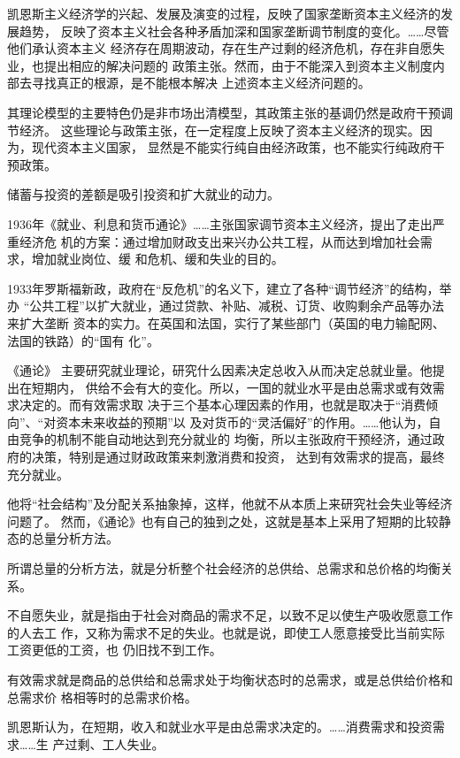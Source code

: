 
凯恩斯主义经济学的兴起、发展及演变的过程，反映了国家垄断资本主义经济的发展趋势，
反映了资本主义社会各种矛盾加深和国家垄断调节制度的变化。……尽管他们承认资本主义
经济存在周期波动，存在生产过剩的经济危机，存在非自愿失业，也提出相应的解决问题的
政策主张。然而，由于不能深入到资本主义制度内部去寻找真正的根源，是不能根本解决
上述资本主义经济问题的。

其理论模型的主要特色仍是非市场出清模型，其政策主张的基调仍然是政府干预调节经济。
这些理论与政策主张，在一定程度上反映了资本主义经济的现实。因为，现代资本主义国家，
显然是不能实行纯自由经济政策，也不能实行纯政府干预政策。

储蓄与投资的差额是吸引投资和扩大就业的动力。

1936年《就业、利息和货币通论》……主张国家调节资本主义经济，提出了走出严重经济危
机的方案：通过增加财政支出来兴办公共工程，从而达到增加社会需求，增加就业岗位、缓
和危机、缓和失业的目的。

1933年罗斯福新政，政府在“反危机”的名义下，建立了各种“调节经济”的结构，举办
“公共工程”以扩大就业，通过贷款、补贴、减税、订货、收购剩余产品等办法来扩大垄断
资本的实力。在英国和法国，实行了某些部门（英国的电力输配网、法国的铁路）的“国有
化”。

《通论》 主要研究就业理论，研究什么因素决定总收入从而决定总就业量。他提出在短期内，
供给不会有大的变化。所以，一国的就业水平是由总需求或有效需求决定的。而有效需求取
决于三个基本心理因素的作用，也就是取决于“消费倾向”、“对资本未来收益的预期”以
及对货币的“灵活偏好”的作用。……他认为，自由竞争的机制不能自动地达到充分就业的
均衡，所以主张政府干预经济，通过政府的决策，特别是通过财政政策来刺激消费和投资，
达到有效需求的提高，最终充分就业。

他将“社会结构”及分配关系抽象掉，这样，他就不从本质上来研究社会失业等经济问题了。
然而，《通论》也有自己的独到之处，这就是基本上采用了短期的比较静态的总量分析方法。

所谓总量的分析方法，就是分析整个社会经济的总供给、总需求和总价格的均衡关系。

不自愿失业，就是指由于社会对商品的需求不足，以致不足以使生产吸收愿意工作的人去工
作，又称为需求不足的失业。也就是说，即使工人愿意接受比当前实际工资更低的工资，也
仍旧找不到工作。

有效需求就是商品的总供给和总需求处于均衡状态时的总需求，或是总供给价格和总需求价
格相等时的总需求价格。

凯恩斯认为，在短期，收入和就业水平是由总需求决定的。……消费需求和投资需求……生
产过剩、工人失业。

